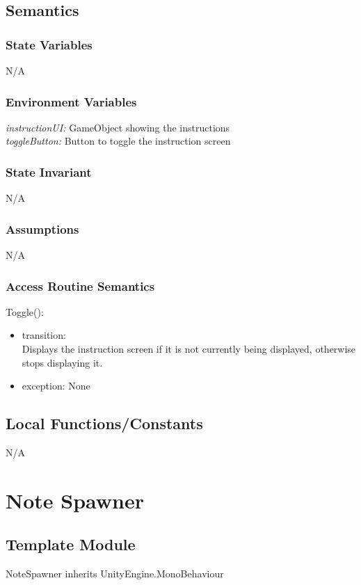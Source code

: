 \documentclass[12pt]{article}
\begin{document}
\subsection{Semantics}
\subsubsection{State Variables}
N/A

\subsubsection{Environment Variables}
\textit{instructionUI:} GameObject showing the instructions\\
\textit{toggleButton:} Button to toggle the instruction screen

\subsubsection{State Invariant}
N/A

\subsubsection{Assumptions}
N/A

\subsubsection{Access Routine Semantics}
\noindent Toggle():
\begin{itemize}
	\item transition:\\
	    Displays the instruction screen if it is not currently being displayed, otherwise stops displaying it.
	\item exception: None
\end{itemize}

\subsection{Local Functions/Constants}
N/A

\newpage

\section{Note Spawner}

\subsection{Template Module}
NoteSpawner inherits UnityEngine.MonoBehaviour
\end{document}
